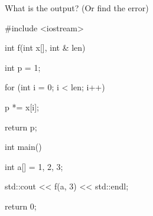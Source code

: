 What is the output? (Or find the error)



\begin{consolethree}[escapeinside=||]

#include <iostream>



int f(int x[], int & len)

{

    int p = 1;

    for (int i = 0; i < len; i++)

    {

        p *= x[i];

    }

    return p;

}



int main()

{

    int a[] = {1, 2, 3};

    std::cout << f(a, 3) << std::endl;

    return 0;

}

\end{consolethree}

